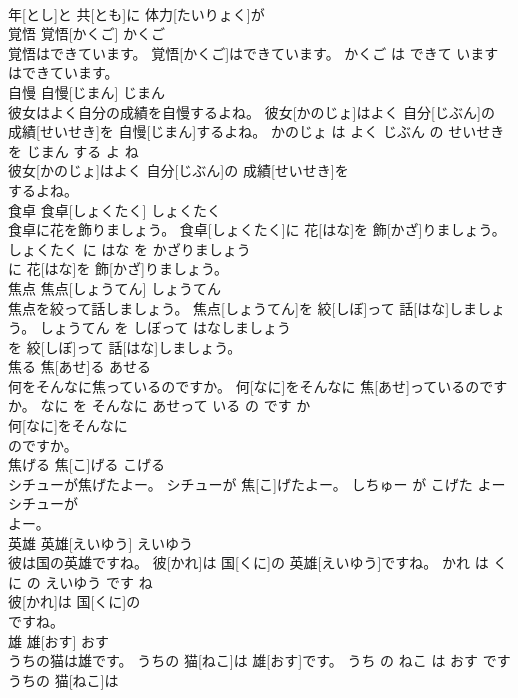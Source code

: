 \documentclass[8pt]{extreport}
\begin{document}
\begin{CJK}{UTF8}{min}
\\	年[とし]と 共[とも]に 体力[たいりょく]が
\\	覚悟	覚悟[かくご]	かくご	
\\	覚悟はできています。	覚悟[かくご]はできています。	かくご は できて います	
\\	はできています。			
\\	自慢	自慢[じまん]	じまん	
\\	彼女はよく自分の成績を自慢するよね。	彼女[かのじょ]はよく 自分[じぶん]の 成績[せいせき]を 自慢[じまん]するよね。	かのじょ は よく じぶん の せいせき を じまん する よ ね	
\\	彼女[かのじょ]はよく 自分[じぶん]の 成績[せいせき]を
\\	するよね。			
\\	食卓	食卓[しょくたく]	しょくたく	
\\	食卓に花を飾りましょう。	食卓[しょくたく]に 花[はな]を 飾[かざ]りましょう。	しょくたく に はな を かざりましょう	
\\	に 花[はな]を 飾[かざ]りましょう。			
\\	焦点	焦点[しょうてん]	しょうてん	
\\	焦点を絞って話しましょう。	焦点[しょうてん]を 絞[しぼ]って 話[はな]しましょう。	しょうてん を しぼって はなしましょう	
\\	を 絞[しぼ]って 話[はな]しましょう。			
\\	焦る	焦[あせ]る	あせる	
\\	何をそんなに焦っているのですか。	何[なに]をそんなに 焦[あせ]っているのですか。	なに を そんなに あせって いる の です か	
\\	何[なに]をそんなに
\\	のですか。			
\\	焦げる	焦[こ]げる	こげる	
\\	シチューが焦げたよー。	シチューが 焦[こ]げたよー。	しちゅー が こげた よー	
\\	シチューが
\\	よー。			
\\	英雄	英雄[えいゆう]	えいゆう	
\\	彼は国の英雄ですね。	彼[かれ]は 国[くに]の 英雄[えいゆう]ですね。	かれ は くに の えいゆう です ね	
\\	彼[かれ]は 国[くに]の
\\	ですね。			
\\	雄	雄[おす]	おす	
\\	うちの猫は雄です。	うちの 猫[ねこ]は 雄[おす]です。	うち の ねこ は おす です	
\\	うちの 猫[ねこ]は

\end{CJK}
\end{document}
